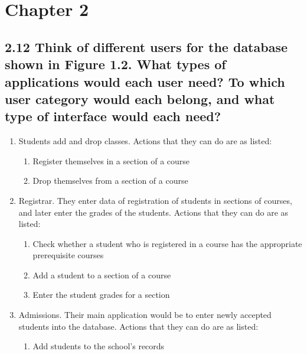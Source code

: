 \section*{Chapter 2}
\subsection*{2.12 Think of different users for the database shown in Figure 1.2. What types of applications would each user need? To which user category would each belong, and what type of interface would each need?}

\begin{enumerate}
  \item Students add and drop classes. Actions that they can do are as listed:
    \begin{enumerate}
       \item Register themselves in a section of a course
       \item Drop themselves from a section of a course 
    \end{enumerate}
  \item Registrar. They enter data of registration of students in sections of courses, and later enter the grades of the students. Actions that they can do are as listed:
    \begin{enumerate}
        \item Check whether a student who is registered in a course has the appropriate prerequisite courses
       \item Add a student to a section of a course
       \item Enter the student grades for a section
    \end{enumerate}
  \item Admissions. Their main application would be to enter newly accepted students into the database. Actions that they can do are as listed:
    \begin{enumerate}
    	\item Add students to the school's records
    \end{enumerate}
\end{enumerate}